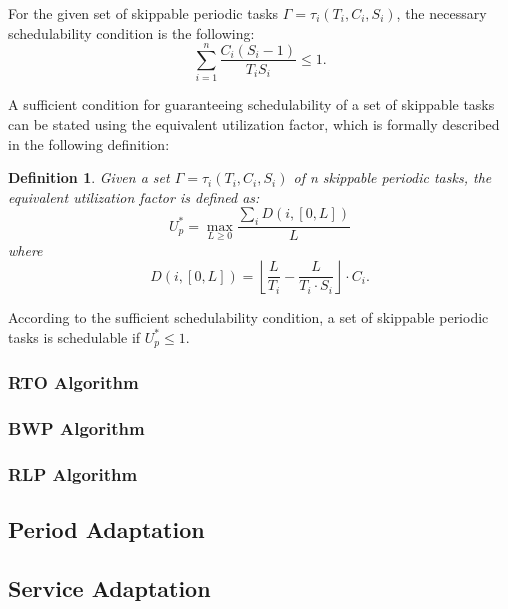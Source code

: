 For the given set of skippable periodic tasks \( \Gamma = {\tau_i(T_i,C_i,S_i)} \), the necessary schedulability condition is the following:
\begin{equation}
\sum_{i=1}^{n} \frac{C_i(S_i-1)}{T_i S_i} \leq 1.
\end{equation}

A sufficient condition for guaranteeing schedulability of a set of skippable tasks can be stated 
using the equivalent utilization factor, which is formally described in the following definition:
\newtheorem{mydef}{Definition}
\begin{mydef}
Given a set \( \Gamma = {\tau_i(T_i,C_i,S_i)} \) of n skippable periodic tasks, the equivalent utilization factor is defined as:
\begin{equation*}
U_p^\ast = \max_{L \geq 0} \frac{\sum_{i}D(i, [0,L])}{L}
\end{equation*}
where
\begin{equation*}
D(i, [0,L]) = \left\lfloor \frac{L}{T_i} - \frac{L}{T_i \cdot S_i}\right\rfloor \cdot C_i.
\end{equation*}
\end{mydef}

According to the sufficient schedulability condition, a set of skippable periodic tasks is schedulable if \( U_p^\ast \leq 1 \).

\subsubsection{RTO Algorithm}
\subsubsection{BWP Algorithm}
\subsubsection{RLP Algorithm}


\subsection{Period Adaptation}
\subsection{Service Adaptation}